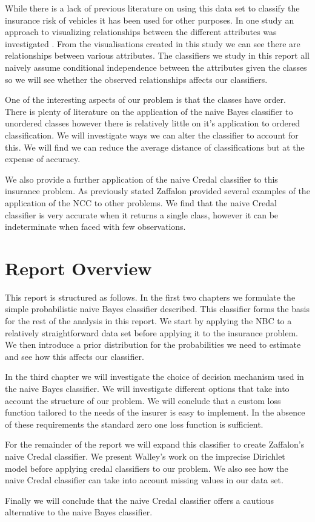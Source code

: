 While there is a lack of previous literature on using this data set to classify the insurance risk of vehicles it has been used for other purposes.
In one study an approach to visualizing relationships between the different attributes was investigated \cite{Rosario04}.
From the visualisations created in this study we can see there are relationships between various attributes.
The classifiers we study in this report all naively assume conditional independence between the attributes given the classes so we will see whether the observed relationships affects our classifiers.

One of the interesting aspects of our problem is that the classes have order.
There is plenty of literature on the application of the naive Bayes classifier to unordered classes however there is relatively little on it's application to ordered classification.
We will investigate ways we can alter the classifier to account for this.
We will find we can reduce the average distance of classifications but at the expense of accuracy.

We also provide a further application of the naive Credal classifier to this insurance problem.
As previously stated Zaffalon provided several examples of the application of the NCC to other problems.
We find that the naive Credal classifier is very accurate when it returns a single class, however it can be indeterminate when faced with few observations.

\section{Report Overview}
This report is structured as follows. In the first two chapters we formulate the simple probabilistic naive Bayes classifier described.
This classifier forms the basis for the rest of the analysis in this report.
We start by applying the NBC to a relatively straightforward data set before applying it to the insurance problem.
We then introduce a prior distribution for the probabilities we need to estimate and see how this affects our classifier.

In the third chapter we will investigate the choice of decision mechanism used in the naive Bayes classifier.
We will investigate different options that take into account the structure of our problem.
We will conclude that a custom loss function tailored to the needs of the insurer is easy to implement.
In the absence of these requirements the standard zero one loss function is sufficient.

For the remainder of the report we will expand this classifier to create Zaffalon's  naive Credal classifier.
We present Walley's work \cite{Walley96} on the imprecise Dirichlet model before applying credal classifiers to our problem.
We also see how the naive Credal classifier can take into account missing values in our data set.

Finally we will conclude that the naive Credal classifier offers a cautious alternative to the naive Bayes classifier.